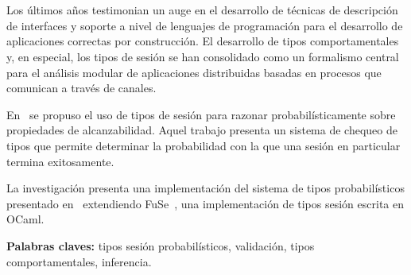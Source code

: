 \chapter*{\runtitulo}

Los últimos años testimonian un auge en el desarrollo de técnicas de
descripción de interfaces y soporte a nivel de lenguajes de
programación para el desarrollo de aplicaciones correctas por construcción. El
desarrollo de tipos comportamentales y, en especial, los tipos de sesión
se han consolidado como un formalismo central para el análisis modular de
aplicaciones distribuidas basadas en procesos que comunican a través de canales.

En~\cite{DBLP:conf/concur/InversoMPTT20} se propuso el uso de tipos de sesión
para razonar probabilísticamente sobre propiedades de alcanzabilidad. Aquel
trabajo presenta un sistema de chequeo de tipos que permite determinar la
probabilidad con la que una sesión en particular termina exitosamente.

La investigación presenta una implementación del sistema de tipos
probabilísticos presentado en~\cite{DBLP:conf/concur/InversoMPTT20} extendiendo
FuSe~\cite{DBLP:journals/jfp/Padovani17}, una implementación de tipos sesión
escrita en OCaml.

\bigskip

\noindent\textbf{Palabras claves:} tipos sesión probabilísticos, validación, tipos comportamentales, inferencia.
